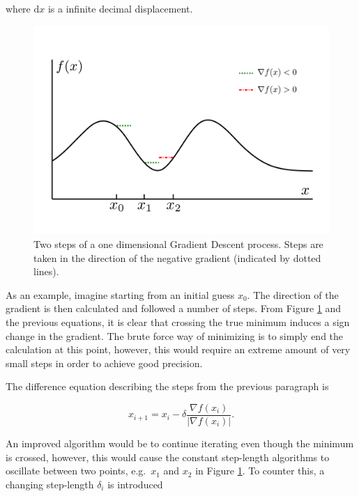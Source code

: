 where $\mathrm{d}x$ is a infinite decimal displacement. 

\begin{figure}
 \begin{center}
  \includegraphics[scale=0.3]{../Graphics/SGD.pdf}
  \caption{Two steps of a one dimensional Gradient Descent process. Steps are taken in the direction of the negative gradient (indicated by dotted lines).}
  \label{fig:SGD}
 \end{center}
\end{figure}

As an example, imagine starting from an initial guess $x_0$. The direction of the gradient is then calculated and followed a number of steps. From Figure \ref{fig:SGD} and the previous equations, it is clear that crossing the true minimum induces a sign change in the gradient. The brute force way of minimizing is to simply end the calculation at this point, however, this would require an extreme amount of very small steps in order to achieve good precision. 

The difference equation describing the steps from the previous paragraph is

\begin{equation}
 x_{i+1} = x_i - \delta\frac{\nabla f(x_i)}{|\nabla f(x_i)|}.
\end{equation}


An improved algorithm would be to continue iterating even though the minimum is crossed, however, this would cause the constant step-length algorithms to oscillate between two points, e.g.~$x_1$ and $x_2$ in Figure \ref{fig:SGD}. To counter this, a changing step-length $\delta_i$ is introduced

